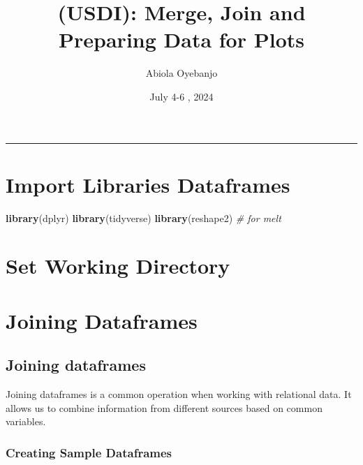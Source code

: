 \documentclass[
]{article}
\title{(USDI): Merge, Join and Preparing Data for Plots}
\author{Abiola Oyebanjo}
\date{July 4-6 , 2024}
\newenvironment{Shaded}{\begin{snugshade}}{\end{snugshade}}
\newcommand{\CommentTok}[1]{\textcolor[rgb]{0.56,0.35,0.01}{\textit{#1}}}
\newcommand{\FunctionTok}[1]{\textcolor[rgb]{0.13,0.29,0.53}{\textbf{#1}}}
\newcommand{\NormalTok}[1]{#1}
\begin{document}
\maketitle

{
\hypersetup{linkcolor=}
\setcounter{tocdepth}{2}
\tableofcontents
}
\begin{center}\rule{0.5\linewidth}{0.5pt}\end{center}

\hypertarget{import-libraries-dataframes}{%
\section{Import Libraries
Dataframes}\label{import-libraries-dataframes}}

\begin{Shaded}
\begin{Highlighting}[]
\FunctionTok{library}\NormalTok{(dplyr)}
\FunctionTok{library}\NormalTok{(tidyverse)}
\FunctionTok{library}\NormalTok{(reshape2) }\CommentTok{\# for melt}
\end{Highlighting}
\end{Shaded}

\hypertarget{set-working-directory}{%
\section{Set Working Directory}\label{set-working-directory}}

\hypertarget{joining-dataframes}{%
\section{Joining Dataframes}\label{joining-dataframes}}

\hypertarget{joining-dataframes-1}{%
\subsection{Joining dataframes}\label{joining-dataframes-1}}

Joining dataframes is a common operation when working with relational
data. It allows us to combine information from different sources based
on common variables.

\hypertarget{creating-sample-dataframes}{%
\subsubsection{Creating Sample
Dataframes}\label{creating-sample-dataframes}}
\end{document}
